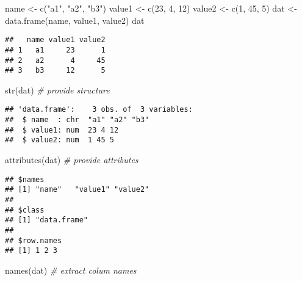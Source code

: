 \documentclass[
]{article}
\newenvironment{Shaded}{\begin{snugshade}}{\end{snugshade}}
\newcommand{\CommentTok}[1]{\textcolor[rgb]{0.56,0.35,0.01}{\textit{#1}}}
\newcommand{\DecValTok}[1]{\textcolor[rgb]{0.00,0.00,0.81}{#1}}
\newcommand{\FunctionTok}[1]{\textcolor[rgb]{0.00,0.00,0.00}{#1}}
\newcommand{\NormalTok}[1]{#1}
\newcommand{\OtherTok}[1]{\textcolor[rgb]{0.56,0.35,0.01}{#1}}
\newcommand{\StringTok}[1]{\textcolor[rgb]{0.31,0.60,0.02}{#1}}
\begin{document}
\begin{Shaded}
\begin{Highlighting}[]
\NormalTok{name   }\OtherTok{\textless{}{-}} \FunctionTok{c}\NormalTok{(}\StringTok{"a1"}\NormalTok{, }\StringTok{"a2"}\NormalTok{, }\StringTok{"b3"}\NormalTok{)}
\NormalTok{value1 }\OtherTok{\textless{}{-}} \FunctionTok{c}\NormalTok{(}\DecValTok{23}\NormalTok{, }\DecValTok{4}\NormalTok{, }\DecValTok{12}\NormalTok{)}
\NormalTok{value2 }\OtherTok{\textless{}{-}} \FunctionTok{c}\NormalTok{(}\DecValTok{1}\NormalTok{, }\DecValTok{45}\NormalTok{, }\DecValTok{5}\NormalTok{)}
\NormalTok{dat    }\OtherTok{\textless{}{-}} \FunctionTok{data.frame}\NormalTok{(name, value1, value2)}
\NormalTok{dat}
\end{Highlighting}
\end{Shaded}

\begin{verbatim}
##   name value1 value2
## 1   a1     23      1
## 2   a2      4     45
## 3   b3     12      5
\end{verbatim}

\begin{Shaded}
\begin{Highlighting}[]
\FunctionTok{str}\NormalTok{(dat) }\CommentTok{\# provide structure}
\end{Highlighting}
\end{Shaded}

\begin{verbatim}
## 'data.frame':    3 obs. of  3 variables:
##  $ name  : chr  "a1" "a2" "b3"
##  $ value1: num  23 4 12
##  $ value2: num  1 45 5
\end{verbatim}

\begin{Shaded}
\begin{Highlighting}[]
\FunctionTok{attributes}\NormalTok{(dat) }\CommentTok{\# provide attributes}
\end{Highlighting}
\end{Shaded}

\begin{verbatim}
## $names
## [1] "name"   "value1" "value2"
## 
## $class
## [1] "data.frame"
## 
## $row.names
## [1] 1 2 3
\end{verbatim}

\begin{Shaded}
\begin{Highlighting}[]
\FunctionTok{names}\NormalTok{(dat) }\CommentTok{\# extract colum names}
\end{Highlighting}
\end{Shaded}
\end{document}
